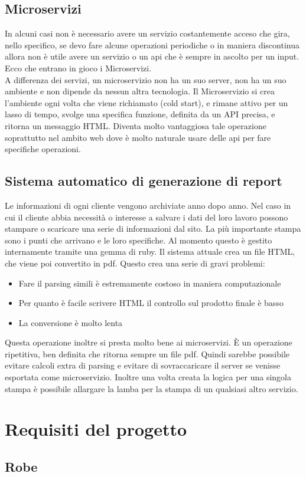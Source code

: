\documentclass[12pt]{article}
\begin{document}
\subsection{Microservizi}
In alcuni casi non è necessario avere un servizio costantemente acceso che gira, 
nello specifico, se devo fare alcune operazioni periodiche o in maniera discontinua 
allora non è utile avere un servizio o un api che è sempre in ascolto per un input.
Ecco che entrano in gioco i Microservizi. 
\\ A differenza dei servizi, un microservizio non ha un suo server, non ha un suo 
ambiente e non dipende da nessun altra tecnologia. Il Microservizio si crea 
l'ambiente ogni volta che viene richiamato (cold start), e rimane attivo per un 
lasso di tempo, svolge una specifica funzione, definita da un API precisa, e 
ritorna un messaggio HTML. 
Diventa molto vantaggiosa tale operazione soprattutto nel ambito web dove è molto 
naturale usare delle api per fare specifiche operazioni.
\subsection{Sistema automatico di generazione di report}
Le informazioni di ogni cliente vengono archiviate anno dopo anno. Nel caso in cui 
il cliente abbia necessità o interesse a salvare i dati del loro lavoro possono 
stampare o scaricare una serie di informazioni dal sito. La più importante stampa 
sono i punti che arrivano e le loro specifiche. Al momento questo è gestito
internamente tramite una gemma di ruby. Il sistema attuale crea un file HTML, 
che viene poi convertito in pdf. 
Questo crea una serie di gravi problemi:
\begin{itemize}
  \item Fare il parsing simili è estremamente costoso in maniera computazionale
  \item Per quanto è facile scrivere HTML il controllo sul prodotto finale è basso
  \item La conversione è molto lenta 
\end{itemize}
Questa operazione inoltre si presta molto bene ai microservizi. È un operazione 
ripetitiva, ben definita che ritorna sempre un file pdf. Quindi sarebbe possibile 
evitare calcoli extra di parsing e evitare di sovraccaricare il server se venisse 
esportata come microservizio. 
Inoltre una volta creata la logica per una singola stampa è possibile allargare
la lamba per la stampa di un qualsiasi altro servizio. 
\section{Requisiti del progetto}
\subsection{Robe}
\end{document}
